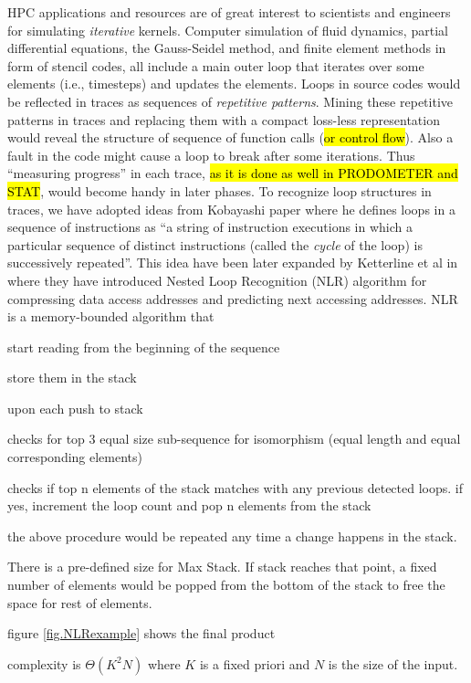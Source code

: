 HPC applications and resources are of great interest to scientists and engineers for simulating \textit{iterative} kernels. Computer simulation of fluid dynamics, partial differential equations, the Gauss-Seidel method, and finite element methods in form of stencil codes, all include a main outer loop that iterates over some elements (i.e., timesteps) and updates the elements.
%
Loops in source codes would be reflected in traces as sequences of \textit{repetitive patterns}.
%
Mining these repetitive patterns in traces and replacing them with a compact loss-less representation would reveal the structure of sequence of function calls (\hl{or control flow}). 
%
Also a fault in the code might cause a loop to break after some iterations. Thus ``measuring progress'' in each trace, \hl{as it is done as well in PRODOMETER and STAT}, would become handy in later phases. 
%
To recognize loop structures in traces, we have adopted ideas from Kobayashi \cite{kobayashi-84} paper where he defines loops in a sequence of instructions as ``a string of instruction executions in which a particular sequence of distinct instructions (called the \textit{cycle} of the loop) is successively repeated''.
%
This idea have been later expanded by Ketterline et al in \cite{Ketterlin-nlr} where they have introduced Nested Loop Recognition (NLR) algorithm for compressing data access addresses and predicting next accessing addresses.
%
NLR is a memory-bounded algorithm that 

start reading from the beginning of the sequence

store them in the stack

upon each push to stack

	checks for top 3 equal size sub-sequence for isomorphism (equal length and equal corresponding elements)
	
	checks if top n elements of the stack matches with any previous detected loops. if yes, increment the loop count and pop n elements from the stack
	
the above procedure would be repeated any time a change happens in the stack. 

There is a pre-defined size for Max Stack. If stack reaches that point, a fixed number of elements would be popped from the bottom of the stack to free the space for rest of elements.

figure \ref{fig.NLRexample} shows the final product

complexity is $\Theta(K^2N)$ where $K$ is a fixed priori and $N$ is the size of the input. 
%

